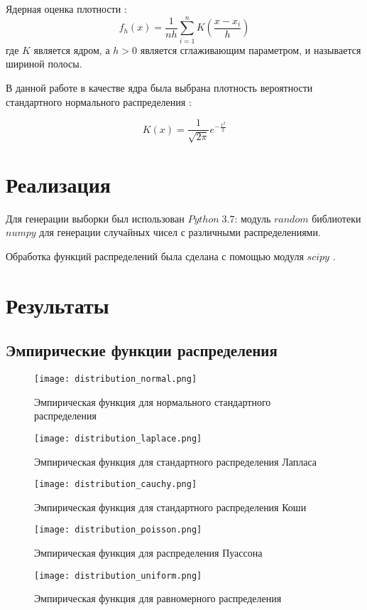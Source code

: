 \documentclass[a4]{article}
\begin{document}
Ядерная оценка плотности \cite{art}:
\begin{equation}
    f_h(x) = \frac{1}{nh}\sum\limits_{i=1}^nK\left(\frac{x-x_i}{h}\right)\label{eqn:art}
\end{equation}
где $K$ является ядром, а $h>0$ является сглаживающим параметром, и называется шириной полосы.

В данной работе в качестве ядра была выбрана плотность вероятности стандартного нормального распределения \cite{link:pdf}:

\begin{equation}
    K(x) = \frac{1}{\sqrt{2\pi}}e^{-\frac{x^2}{2}}
\end{equation}

\section{Реализация}
Для генерации выборки был использован $Python\;3.7$: модуль $random$ библиотеки $numpy$ \cite{numpy} для генерации случайных чисел с различными распределениями. 

Обработка функций распределений была сделана с помощью модуля $scipy$ \cite{skp}.

\newpage
\section{Результаты}
\subsection{Эмпирические функции распределения}
\begin{center}

\begin{figure}[H]
\caption{Эмпирическая функция для нормального стандартного распределения}
\texttt{[image: distribution\_normal.png]}
\end{figure}

\begin{figure}[H]
\caption{Эмпирическая функция для стандартного распределения Лапласа }
\texttt{[image: distribution\_laplace.png]} 
\end{figure}

\begin{figure}[H]
\caption{Эмпирическая функция для стандартного распределения Коши }
\texttt{[image: distribution\_cauchy.png]} 
\end{figure}

\begin{figure}[H]
\caption{Эмпирическая функция для распределения Пуассона }
\texttt{[image: distribution\_poisson.png]} 
\end{figure}

\begin{figure}[H]
 \caption{Эмпирическая функция для равномерного распределения }
\texttt{[image: distribution\_uniform.png]}
\end{figure}
\end{center}
\end{document}
